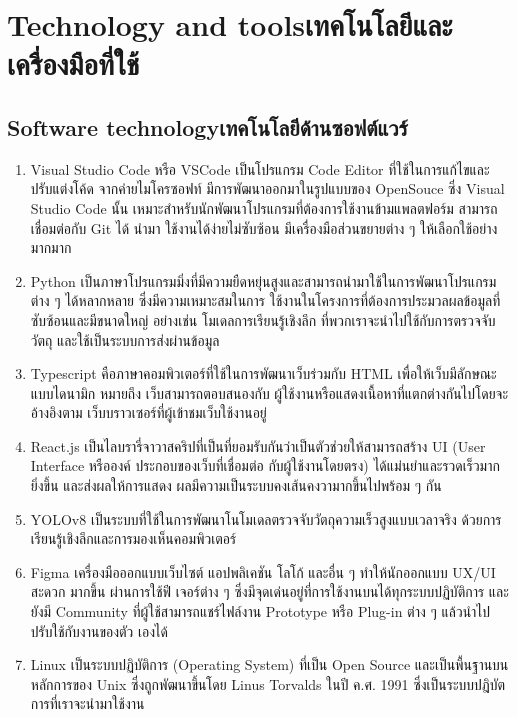 \section{\ifenglish Technology and tools\else เทคโนโลยีและเครื่องมือที่ใช้\fi}


\subsection{\ifenglish Software technology\else เทคโนโลยีด้านซอฟต์แวร์\fi}

\begin{enumerate}
    \item Visual Studio Code หรือ VSCode เป็นโปรแกรม Code Editor ที่ใช้ในการแก้ไขและปรับแต่งโค้ด จากค่ายไมโครซอฟท์ 
    มีการพัฒนาออกมาในรูปแบบของ OpenSouce ซึ่ง Visual Studio Code นั้น เหมาะสําหรับนักพัฒนาโปรแกรมที่ต้องการใช้งานข้ามแพลตฟอร์ม 
    สามารถเชื่อมต่อกับ Git ได้ นํามา ใช้งานได้ง่ายไม่ซับซ้อน มีเครื่องมือส่วนขยายต่าง ๆ ให้เลือกใช้อย่างมากมาก 

    \item Python เป็นภาษาโปรแกรมมิ่งที่มีความยืดหยุ่นสูงและสามารถนำมาใช้ในการพัฒนาโปรแกรมต่าง ๆ ได้หลากหลาย ซึ่งมีความเหมาะสมในการ
    ใช้งานในโครงการที่ต้องการประมวลผลข้อมูลที่ซับซ้อนและมีขนาดใหญ่ อย่างเช่น โมเดลการเรียนรู้เชิงลึก ที่พวกเราจะนำไปใช้กับการตรวจจับวัตถุ 
    และใช้เป็นระบบการส่งผ่านข้อมูล 
    
    \item Typescript คือภาษาคอมพิวเตอร์ที่ใช้ในการพัฒนาเว็บร่วมกับ HTML เพื่อให้เว็บมีลักษณะแบบไดนามิก หมายถึง เว็บสามารถตอบสนองกับ
    ผู้ใช้งานหรือแสดงเนื้อหาที่แตกต่างกันไปโดยจะอ้างอิงตาม เว็บบราวเซอร์ที่ผู้เข้าชมเว็บใช้งานอยู่ 
    
    \item React.js เป็นไลบรารี่จาวาสคริปที่เป็นที่ยอมรับกันว่าเป็นตัวช่วยให้สามารถสร้าง UI (User Interface หรือองค์ ประกอบของเว็บที่เชื่อมต่อ
    กับผู้ใช้งานโดยตรง) ได้แม่นยําและรวดเร็วมากยิ่งขึ้น และส่งผลให้การแสดง ผลมีความเป็นระบบคงเส้นคงวามากขึ้นไปพร้อม ๆ กัน
    
    \item YOLOv8 เป็นระบบที่ใช้ในการพัฒนาโนโมเดลตรวจจับวัตถุความเร็วสูงแบบเวลาจริง ด้วยการเรียนรู้เชิงลึกและการมองเห็นคอมพิวเตอร์ 
    
    \item Figma เครื่องมือออกแบบเว็บไซต์ แอปพลิเคชัน โลโก้ และอื่น ๆ ทําให้นักออกแบบ UX/UI สะดวก มากขึ้น ผ่านการใช้ฟี เจอร์ต่าง ๆ 
    ซึ่งมีจุดเด่นอยู่ที่การใช้งานบนได้ทุกระบบปฏิบัติการ และยังมี Community ที่ผู้ใช้สามารถแชร์ไฟล์งาน Prototype หรือ Plug-in ต่าง ๆ 
    แล้วนําไปปรับใช้กับงานของตัว เองได้ 

    \item Linux เป็นระบบปฏิบัติการ (Operating System) ที่เป็น Open Source และเป็นพื้นฐานบนหลักการของ Unix ซึ่งถูกพัฒนาขึ้นโดย 
    Linus Torvalds ในปี ค.ศ. 1991 ซึ่งเป็นระบบปฎิบัตการที่เราจะนำมาใช้งาน 
\end{enumerate}

